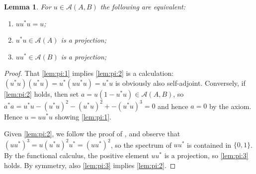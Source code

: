 \documentclass[a4paper,11pt]{article}
\theoremstyle{plain}
\newtheorem{lemma}[proposition]{Lemma}
\theoremstyle{remark}
\newcommand{\mc}[1]{\mathcal{#1}}
\begin{document}
\begin{lemma}\label{lem:pi}
For $u\in\mc A(A,B)$ the following are equivalent:
\begin{enumerate}[(1)]
  \item\label{lem:pi:1}
    $uu^*u=u$;
  \item\label{lem:pi:2}
    $u^*u \in \mc A(A)$ is a projection;
  \item\label{lem:pi:3}
    $uu^* \in \mc A(B)$ is a projection;
\end{enumerate}
\end{lemma}
\begin{proof}
That \ref{lem:pi:1} implies \ref{lem:pi:2} is a calculation: $(u^*u)(u^*u) = u^*(uu^*u) = u^*u$ is obviously also self-adjoint.  Conversely, if \ref{lem:pi:2} holds, then set $a = u(1-u^*u) \in \mc A(A,B)$, so $a^*a = u^*u - (u^*u)^2 - (u^*u)^2 + - (u^*u)^3 = 0$ and hence $a=0$ by the axiom.  Hence $u = uu^*u$ showing \ref{lem:pi:1}.

Given \ref{lem:pi:2}, we follow the proof of \cite[Theorem~2.3.2]{Murphy_book}, and observe that $(uu^*)^3 = u (u^*u)^2 u^* = (uu^*)^2$, so the spectrum of $uu^*$ is contained in $\{0,1\}$.  By the functional calculus, the positive element $uu^*$ is a projection, so \ref{lem:pi:3} holds.  By symmetry, also \ref{lem:pi:3} implies \ref{lem:pi:2}.
\end{proof}
\end{document}

